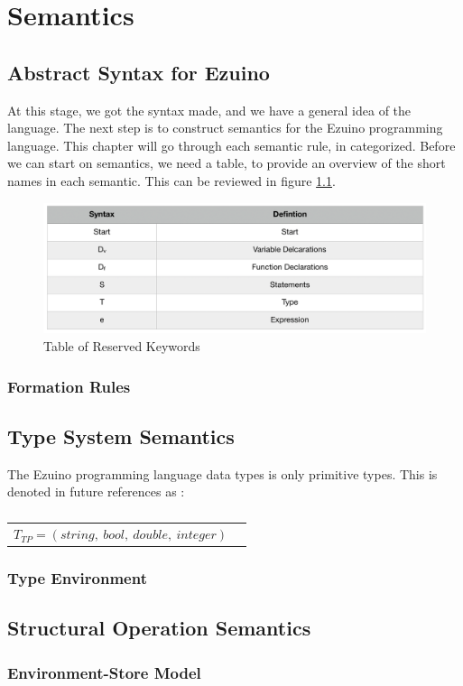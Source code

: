 \chapter{Semantics}
\label{semantics}
\section{Abstract Syntax for Ezuino}
At this stage, we got the syntax made, and we have a general idea of the language. The next step is to construct semantics for the Ezuino programming language. This chapter will go through each semantic rule, in categorized. 
Before we can start on semantics, we need a table, to provide an overview of the short names in each semantic. This can be  reviewed in figure \ref{semCat}.
\begin{figure}[H]
\centering
\includegraphics[scale=0.75]{figures/semantics/categories.png}
\caption{Table of Reserved Keywords}
\label{semCat}
\end{figure}


\subsection{Formation Rules}
\section{Type System Semantics}
The Ezuino programming language data types is only primitive types. This is denoted in future references as :
\begin{table}[H]
    \centering
    \begin{longtable}[c] { r c }
      
        \( { T_{TP} = (string,\ bool,\ double,\ integer)} \) \\
    \end{longtable}
    \caption{}\label{s-empty}
\end{table}





\subsection{Type Environment}

\section{Structural Operation Semantics}
\subsection{Environment-Store Model}

